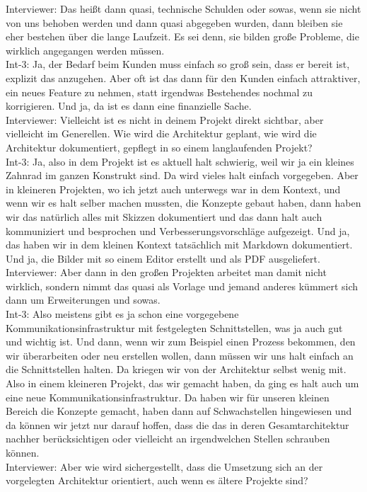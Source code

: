 Interviewer: Das heißt dann quasi, technische Schulden oder sowas, wenn sie nicht von uns behoben werden und dann quasi abgegeben wurden, dann bleiben sie eher bestehen über die lange Laufzeit. Es sei denn, sie bilden große Probleme, die wirklich angegangen werden müssen.\\
Int-3: Ja, der Bedarf beim Kunden muss einfach so groß sein, dass er bereit ist, explizit das anzugehen. Aber oft ist das dann für den Kunden einfach attraktiver, ein neues Feature zu nehmen, statt irgendwas Bestehendes nochmal zu korrigieren. Und ja, da ist es dann eine finanzielle Sache. \\
Interviewer: Vielleicht ist es nicht in deinem Projekt direkt sichtbar, aber vielleicht im Generellen. Wie wird die Architektur geplant, wie wird die Architektur dokumentiert, gepflegt in so einem langlaufenden Projekt? \\
Int-3: Ja, also in dem Projekt ist es aktuell halt schwierig, weil wir ja ein kleines Zahnrad im ganzen Konstrukt sind. Da wird vieles halt einfach vorgegeben. Aber in kleineren Projekten, wo ich jetzt auch unterwegs war in dem Kontext, und wenn wir es halt selber machen mussten, die Konzepte gebaut haben, dann haben wir das natürlich alles mit Skizzen dokumentiert und das dann halt auch kommuniziert und besprochen und Verbesserungsvorschläge aufgezeigt. Und ja, das haben wir in dem kleinen Kontext tatsächlich mit Markdown dokumentiert. Und ja, die Bilder mit so einem Editor erstellt und als PDF ausgeliefert. \\
Interviewer: Aber dann in den großen Projekten arbeitet man damit nicht wirklich, sondern nimmt das quasi als Vorlage und jemand anderes kümmert sich dann um Erweiterungen und sowas.\\
Int-3: Also meistens gibt es ja schon eine vorgegebene Kommunikationsinfrastruktur mit festgelegten Schnittstellen, was ja auch gut und wichtig ist. Und dann, wenn wir zum Beispiel einen Prozess bekommen, den wir überarbeiten oder neu erstellen wollen, dann müssen wir uns halt einfach an die Schnittstellen halten. Da kriegen wir von der Architektur selbst wenig mit. Also in einem kleineren Projekt, das wir gemacht haben, da ging es halt auch um eine neue Kommunikationsinfrastruktur. Da haben wir für unseren kleinen Bereich die Konzepte gemacht, haben dann auf Schwachstellen hingewiesen und da können wir jetzt nur darauf hoffen, dass die das in deren Gesamtarchitektur nachher berücksichtigen oder vielleicht an irgendwelchen Stellen schrauben können.\\
Interviewer: Aber wie wird sichergestellt, dass die Umsetzung sich an der vorgelegten Architektur orientiert, auch wenn es ältere Projekte sind? \\
